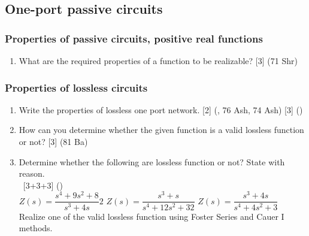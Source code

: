 \documentclass[12pt]{article}
\newcommand{\enter}{\\\textcolor{white}{1}}
\begin{document}
	\subsection{One-port passive circuits}
		\subsubsection{Properties of passive circuits, positive real functions}
			\begin{enumerate}[noitemsep, topsep=0pt]
				\item What are the required properties of a function to be realizable? \hfill [3] (71 Shr)
			\end{enumerate}
			
		\subsubsection{Properties of lossless circuits}
			\begin{enumerate}[noitemsep, topsep=0pt]
				\item Write the properties of lossless one port network. \hfill [2] (, 76 Ash, 74 Ash) [3] ()
				
				\item How can you determine whether the given function is a valid lossless function or not? \hfill [3] (81 Ba)
				
				\item Determine whether the following are lossless function or not? State with reason. 
				\enter\hfill [3+3+3] ()\\
				$Z(s) = \dfrac{s^4+9s^2+8}{s^3+4s}2$ \hspace{1cm}
				$Z(s) = \dfrac{s^3+s}{s^4+12s^2+32}$ \hspace{1cm}
				$Z(s) = \dfrac{s^3+4s}{s^4+4s^2+3}$\\
				Realize one of the valid lossless function using Foster Series and Cauer I methods.
			\end{enumerate}
\end{document}
